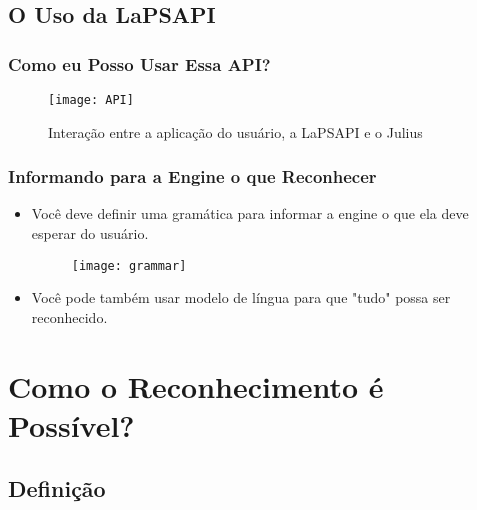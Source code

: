 \documentclass{beamer}
\begin{document}
\subsection{O Uso da LaPSAPI}
\begin{frame}
   \frametitle{Como eu Posso Usar Essa API?}
   \begin{figure}
      \label{fig:interation_julius}
      \texttt{[image: API]}
      \caption{Interação entre a aplicação do usuário, a LaPSAPI e o Julius}
   \end{figure}
\end{frame}

\begin{frame}[fragile]
   \frametitle{Informando para a Engine o que Reconhecer}
   \begin{itemize}
      \item Você deve definir uma gramática para informar a engine o
	 que ela deve esperar do usuário.

      \begin{figure}
	 \texttt{[image: grammar]}
      \end{figure}

      \pause
      \item Você pode também usar modelo de língua para que
	 "tudo" possa ser reconhecido.
   \end{itemize}
\end{frame}

\section[Como Funciona?]{Como o Reconhecimento é Possível?}
\subsection{Definição}
\end{document}
